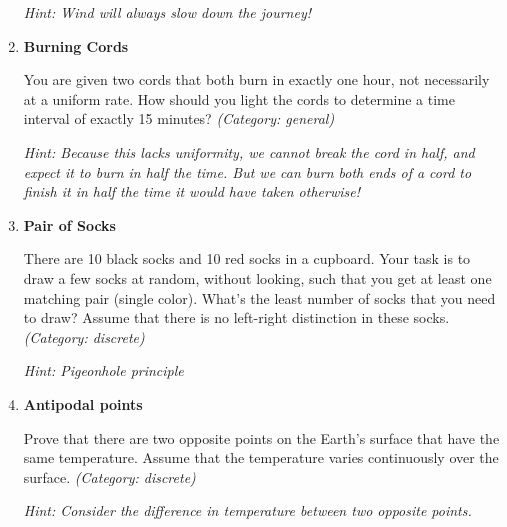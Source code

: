\begin{enumerate}
\small\emph{Hint: Wind will always slow down the journey!}





\item \textbf{Burning Cords}

You are given two cords that both burn in exactly one hour, not necessarily at a uniform rate. How should you light the cords to determine a time interval of exactly 15 minutes?
\small\emph{(Category: general)}

\small\emph{Hint: Because this lacks uniformity, we cannot break the cord in half, and expect it to burn in half the time. But we can burn both ends of a cord to finish it in half the time it would have taken otherwise!}





\item \textbf{Pair of Socks}

There are 10 black socks and 10 red socks in a cupboard. Your task is to draw a few socks at random, without looking, such that you get at least one matching pair (single color). What's the least number of socks that you need to draw?
Assume that there is no left-right distinction in these socks.
\small\emph{(Category: discrete)}

\small\emph{Hint: Pigeonhole principle}





\item \textbf{Antipodal points}

Prove that there are two opposite points on the Earth's surface that have the same temperature.
Assume that the temperature varies continuously over the surface.
\small\emph{(Category: discrete)}

\small\emph{Hint: Consider the difference in temperature between two opposite points.}





\end{enumerate}
